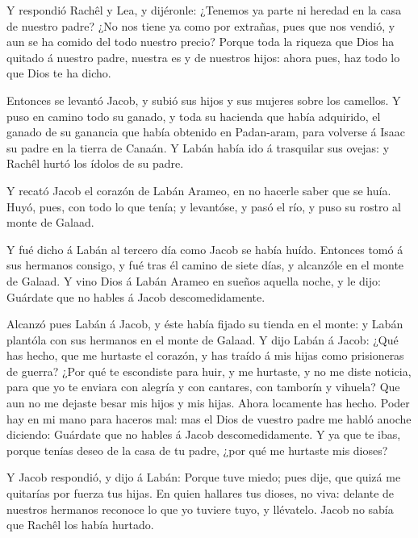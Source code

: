  Y respondió Rachêl y Lea, y dijéronle: ¿Tenemos ya parte
ni heredad en la casa de nuestro padre?  ¿No nos tiene ya
como por extrañas, pues que nos vendió, y aun se ha comido del todo
nuestro precio?  Porque toda la riqueza que Dios ha quitado
á nuestro padre, nuestra es y de nuestros hijos: ahora pues, haz todo lo
que Dios te ha dicho.

 Entonces se levantó Jacob, y subió sus hijos y sus mujeres
sobre los camellos.  Y puso en camino todo su ganado, y
toda su hacienda que había adquirido, el ganado de su ganancia que había
obtenido en Padan-aram, para volverse á Isaac su padre en la tierra de
Canaán.  Y Labán había ido á trasquilar sus ovejas: y
Rachêl hurtó los ídolos de su padre.

 Y recató Jacob el corazón de Labán Arameo, en no hacerle
saber que se huía.  Huyó, pues, con todo lo que tenía; y
levantóse, y pasó el río, y puso su rostro al monte de Galaad.

 Y fué dicho á Labán al tercero día como Jacob se había
huído.  Entonces tomó á sus hermanos consigo, y fué tras él
camino de siete días, y alcanzóle en el monte de Galaad.  Y
vino Dios á Labán Arameo en sueños aquella noche, y le dijo: Guárdate
que no hables á Jacob descomedidamente.

 Alcanzó pues Labán á Jacob, y éste había fijado su tienda
en el monte: y Labán plantóla con sus hermanos en el monte de Galaad.
 Y dijo Labán á Jacob: ¿Qué has hecho, que me hurtaste el
corazón, y has traído á mis hijas como prisioneras de guerra?
 ¿Por qué te escondiste para huir, y me hurtaste, y no me
diste noticia, para que yo te enviara con alegría y con cantares, con
tamborín y vihuela?  Que aun no me dejaste besar mis hijos
y mis hijas. Ahora locamente has hecho.  Poder hay en mi
mano para haceros mal: mas el Dios de vuestro padre me habló anoche
diciendo: Guárdate que no hables á Jacob descomedidamente. 
Y ya que te ibas, porque tenías deseo de la casa de tu padre, ¿por qué
me hurtaste mis dioses?

 Y Jacob respondió, y dijo á Labán: Porque tuve miedo; pues
dije, que quizá me quitarías por fuerza tus hijas.  En
quien hallares tus dioses, no viva: delante de nuestros hermanos
reconoce lo que yo tuviere tuyo, y llévatelo. Jacob no sabía que Rachêl
los había hurtado.

